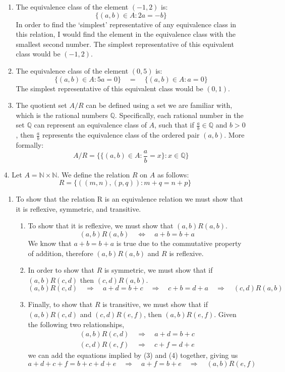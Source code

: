 \documentclass[fleqn]{article}
\begin{document}
\begin{enumerate}
\begin{enumerate}
		\item %
		The equivalence class of the element \((-1, 2)\) is:
		\[\{(a, b) \in A : 2a = -b\}\]
		In order to find the `simplest' representative of any equivalence class in this relation, I would find the element in the equivalence class with the smallest second number. The simplest representative of this equivalent class would be \((-1, 2)\).

		\item %
		The equivalence class of the element \((0, 5)\) is:
		\[\{(a, b) \in A : 5a = 0\} \quad = \quad \{(a, b) \in A : a = 0\}\]
		The simplest representative of this equivalent class would be \((0, 1)\).

		\item %
		The quotient set \(A/R\) can be defined using a set we are familiar with, which is the rational numbers \(\mathbb{Q}\). Specifically, each rational number in the set \(\mathbb{Q}\) can represent an equivalence class of \(A\), such that if \(\frac{a}{b} \in \mathbb{Q}\) and \(b > 0\), then \(\frac{a}{b}\) represents the equivalence class of the ordered pair \((a, b)\). More formally:
		\[A/R = \{\{(a, b) \in A : \frac{a}{b} = x\} : x \in \mathbb{Q}\}\]
	\end{enumerate}

	\item[4.]
	Let \(A = \mathbb{N} \times \mathbb{N}\). We define the relation \(R\) on \(A\) as follows:
	\[R = \{((m, n), (p, q)) : m + q = n + p\}\]
	\begin{enumerate}
		\item %
		To show that the relation R is an equivalence relation we must show that it is reflexive, symmetric, and transitive. 
		\begin{enumerate}
			\item %
			To show that it is reflexive, we must show that \((a, b)R(a, b)\).
			\[(a, b)R(a, b) \quad \Leftrightarrow \quad a + b = b + a\]
			We know that \(a + b = b + a\) is true due to the commutative property of addition, therefore \((a, b)R(a, b)\) and \(R\) is reflexive.
			
			\item %
			In order to show that \(R\) is symmetric, we must show that if \((a, b)R(c, d)\) then \((c, d)R(a, b)\).
			\[(a, b)R(c, d) \quad \Rightarrow \quad a + d = b + c \quad \Rightarrow \quad c + b = d + a \quad \Rightarrow \quad (c, d)R(a, b)\]
			
			\item %
			Finally, to show that \(R\) is transitive, we must show that if \((a, b)R(c, d)\) and \((c, d)R(e, f)\), then \((a, b)R(e, f)\). Given the following two relationships,
			\begin{gather}
				(a, b)R(c, d) \quad \Rightarrow \quad a + d = b + c \\
				(c, d)R(e, f) \quad \Rightarrow \quad c + f = d + e
			\end{gather}
			we can add the equations implied by (3) and (4) together, giving us
			\[a + d + c + f = b + c + d + e \quad \Rightarrow \quad a + f = b + e \quad \Rightarrow \quad (a, b)R(e, f)\]
		\end{enumerate}
			

\end{enumerate}
\end{enumerate}
\end{document}

